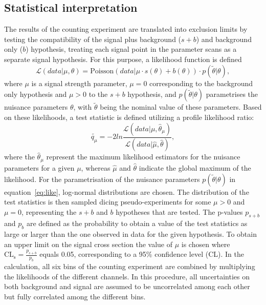 \subsection{Statistical interpretation}
The results of the counting experiment are translated into exclusion limits by testing the compatibility of the signal plus background ($s+b$) and background only ($b$) hypothesis, treating each signal point in the parameter scans as a separate signal hypothesis. For this purpose, a likelihood function is defined~\cite{HiggsTool1}
\begin{equation}
\label{eq:like}
\mathcal{L}(data|\mu,\theta) = \text{Poisson}(data|\mu\cdot s(\theta) + b(\theta))\cdot p(\tilde{\theta}|\theta),
\end{equation}
where $\mu$ is a signal strength parameter, $\mu = 0$ corresponding to the background only hypothesis and $\mu > 0$ to the  $s+b$ hypothesis, and $p(\tilde{\theta}|\theta)$ parametrises the nuisance parameters $\theta$, with $\tilde{\theta}$ being the nominal value of these parameters. Based on these likelihoods, a test statistic is defined utilizing a profile likelihood ratio: 
\begin{equation}
\tilde{q_{\mu}} = -2 ln\frac{\mathcal{L}(data|\mu,\hat{\theta}_\mu)}{\mathcal{L}(data|\hat{\mu},\hat{\theta})},
\end{equation}
where the $\hat{\theta}_\mu$ represent the maximum likelihood estimators for the nuisance parameters for a given $\mu$, whereas $\hat{\mu}$ and $\hat{\theta}$ indicate the global maximum of the likelihood. For the parametrisation of the nuisance parameters $p(\tilde{\theta}|\theta)$ in equation~\ref{eq:like}, log-normal distributions are chosen. The distribution of the test statistics is then sampled dicing pseudo-experiments for some $\mu > 0$ and $\mu = 0$, representing the $s+b$ and $b$ hypotheses that are tested. The p-values $p_{s+b}$ and $p_{b}$ are defined as the probability to obtain a value of the test statistics as large or larger than the one observed in data for the given hypothesis. To obtain an upper limit on the signal cross section the value of $\mu$ is chosen where $\mathrm{CL}_{\mathrm{s}} = \frac{p_{s+b}}{p_b}$ equals 0.05, corresponding to a 95\% confidence level (CL). In the calculation, all six bins of the counting experiment are combined by multiplying the likelihoods of the different channels. In this procedure, all uncertainties on both background and signal are assumed to be uncorrelated among each other but fully correlated among the different bins.

